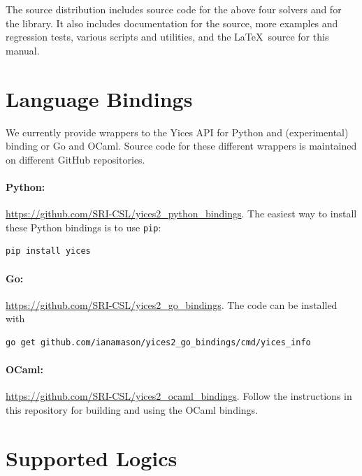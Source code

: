 \documentclass[11pt,twoside,fleqn,openright,titlepage]{cslreport}
\begin{document}
\medskip\noindent
The source distribution includes source code for the above four
solvers and for the library. It also includes documentation for the
source, more examples and regression tests, various scripts and
utilities, and the \LaTeX\ source for this manual.



\section{Language Bindings}
\label{python-bindings}

We currently provide wrappers to the Yices API for Python and (experimental) binding or Go and
OCaml. Source code for these different wrappers is maintained on different GitHub repositories.

\paragraph{Python:} \url{https://github.com/SRI-CSL/yices2_python_bindings}. The easiest way to install these Python bindings is to use \texttt{pip}:
\begin{small}
\begin{lstlisting}[language=sh]
  pip install yices
\end{lstlisting}
\end{small}

\paragraph{Go:} \url{https://github.com/SRI-CSL/yices2_go_bindings}.  The code can be installed with
\begin{small}
\begin{lstlisting}[language=sh]
  go get github.com/ianamason/yices2_go_bindings/cmd/yices_info
\end{lstlisting}
\end{small}

\paragraph{OCaml:} \url{https://github.com/SRI-CSL/yices2_ocaml_bindings}.
Follow the instructions in this repository for building and using the OCaml bindings.

\section{Supported Logics}
\end{document}
